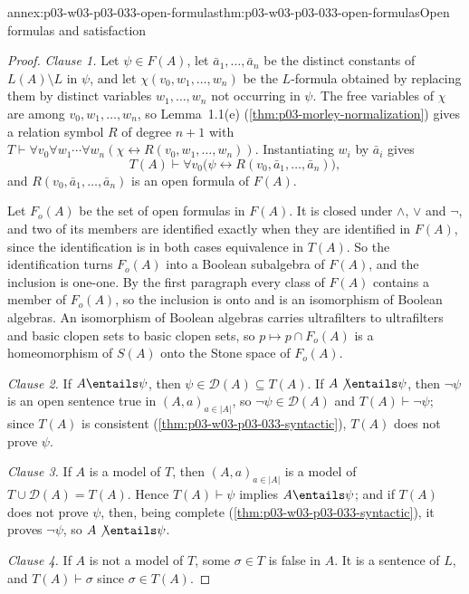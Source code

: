 \begin{annexitem}{annex:p03-w03-p03-033-open-formulas}{thm:p03-w03-p03-033-open-formulas}{Open formulas and satisfaction}
\begin{proof}
\emph{Clause 1.} Let \(\psi\in F(A)\), let \(\bar a_1,\dots,\bar a_n\) be
the distinct constants of \(L(A)\setminus L\) in \(\psi\), and let
\(\chi(v_0,w_1,\dots,w_n)\) be the \(L\)-formula obtained by replacing
them by distinct variables \(w_1,\dots,w_n\) not occurring in \(\psi\).
The free variables of \(\chi\) are among \(v_0,w_1,\dots,w_n\), so
Lemma~1.1(e) (\cref{thm:p03-morley-normalization}) gives a relation
symbol \(R\) of degree \(n+1\) with
\(T\vdash\forall v_0\forall w_1\cdots\forall w_n
(\chi\leftrightarrow R(v_0,w_1,\dots,w_n))\). Instantiating \(w_i\) by
\(\bar a_i\) gives
\[
 T(A)\vdash\forall v_0\bigl(\psi\leftrightarrow R(v_0,\bar a_1,\dots,\bar a_n)\bigr),
\]
and \(R(v_0,\bar a_1,\dots,\bar a_n)\) is an open formula of \(F(A)\).

Let \(F_o(A)\) be the set of open formulas in \(F(A)\). It is closed under
\(\wedge\), \(\vee\) and \(\neg\), and two of its members are identified
exactly when they are identified in \(F(A)\), since the identification is
in both cases equivalence in \(T(A)\). So the identification turns
\(F_o(A)\) into a Boolean subalgebra of \(F(A)\), and the inclusion is
one-one. By the first paragraph every class of \(F(A)\) contains a member
of \(F_o(A)\), so the inclusion is onto and is an isomorphism of Boolean
algebras. An isomorphism of Boolean algebras carries ultrafilters to
ultrafilters and basic clopen sets to basic clopen sets, so
\(p\mapsto p\cap F_o(A)\) is a homeomorphism of \(S(A)\) onto the Stone
space of \(F_o(A)\).

\emph{Clause 2.} If \(A\entails\psi\), then \(\psi\in\mathscr D(A)\subseteq
T(A)\). If \(A\not\entails\psi\), then \(\neg\psi\) is an open sentence true
in \((A,a)_{a\in|A|}\), so \(\neg\psi\in\mathscr D(A)\) and
\(T(A)\vdash\neg\psi\); since \(T(A)\) is consistent
(\cref{thm:p03-w03-p03-033-syntactic}), \(T(A)\) does not prove \(\psi\).

\emph{Clause 3.} If \(A\) is a model of \(T\), then \((A,a)_{a\in|A|}\) is
a model of \(T\cup\mathscr D(A)=T(A)\). Hence \(T(A)\vdash\psi\) implies
\(A\entails\psi\); and if \(T(A)\) does not prove \(\psi\), then, being
complete (\cref{thm:p03-w03-p03-033-syntactic}), it proves \(\neg\psi\), so
\(A\not\entails\psi\).

\emph{Clause 4.} If \(A\) is not a model of \(T\), some \(\sigma\in T\) is
false in \(A\). It is a sentence of \(L\), and \(T(A)\vdash\sigma\) since
\(\sigma\in T(A)\).


\end{proof}
\end{annexitem}
